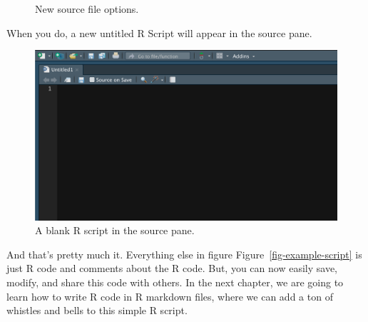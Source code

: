 \documentclass[
  letterpaper,
  DIV=11,
  numbers=noendperiod]{scrreprt}
\begin{document}
\begin{figure}


\caption{\label{fig-new-r-script2}New source file options.}

\end{figure}%

When you do, a new untitled R Script will appear in the source pane.

\begin{figure}[H]

{\centering \includegraphics{chapters/r_scripts/new_r_script3.png}

}

\caption{A blank R script in the source pane.}

\end{figure}%

And that's pretty much it. Everything else in figure
Figure~\ref{fig-example-script} is just R code and comments about the R
code. But, you can now easily save, modify, and share this code with
others. In the next chapter, we are going to learn how to write R code
in R markdown files, where we can add a ton of whistles and bells to
this simple R script.
\end{document}
